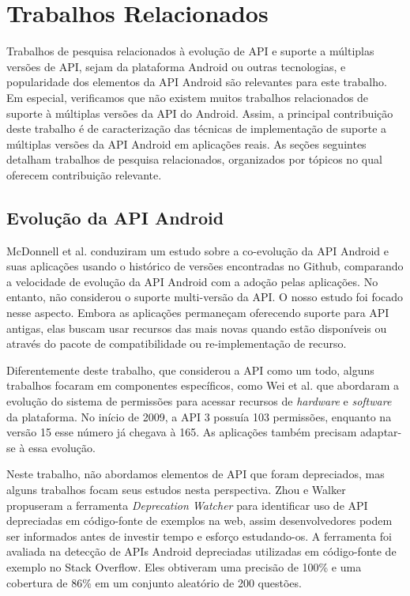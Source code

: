 \chapter{Trabalhos Relacionados} \label{ch:trabalhos-relacionados}

Trabalhos de pesquisa relacionados à evolução de API e suporte a múltiplas versões
de API, sejam da plataforma Android ou outras tecnologias, e popularidade dos
elementos da API Android são relevantes para este trabalho. Em especial, verificamos
que não existem muitos trabalhos relacionados de suporte à múltiplas versões da API
do Android. Assim, a principal contribuição deste trabalho é de caracterização das
técnicas de implementação de suporte a múltiplas versões da API Android em aplicações
reais. As seções seguintes detalham trabalhos de pesquisa relacionados, organizados
por tópicos no qual oferecem contribuição relevante.

\section{Evolução da API Android}

McDonnell et al. \cite{McDonnell2013} conduziram um estudo sobre a co-evolução da API
Android e suas aplicações usando o histórico de versões encontradas no Github, comparando
a velocidade de evolução da API Android com a adoção pelas aplicações. No entanto, não
considerou o suporte multi-versão da API. O nosso estudo foi focado nesse aspecto. Embora
as aplicações permaneçam oferecendo suporte para API antigas, elas buscam usar recursos das
mais novas quando estão disponíveis ou através do pacote de compatibilidade ou re-implementação
de recurso.

Diferentemente deste trabalho, que considerou a API como um todo, alguns trabalhos focaram
em componentes específicos, como Wei et al.\cite{Wei2012} que abordaram a evolução do sistema
de permissões para acessar recursos de \textit{hardware} e \textit{software} da plataforma.
No início de 2009, a API 3 possuía 103 permissões, enquanto na versão 15 esse número já chegava
à 165. As aplicações também precisam adaptar-se à essa evolução. 

Neste trabalho, não abordamos elementos de API que foram depreciados, mas alguns trabalhos
focam seus estudos nesta perspectiva.  Zhou e Walker \cite{Zhou2016} propuseram a ferramenta
\textit{Deprecation Watcher} para identificar uso de API depreciadas em código-fonte de exemplos
na web, assim desenvolvedores podem ser informados antes de investir tempo e esforço estudando-os.
A ferramenta foi avaliada na detecção de APIs Android depreciadas utilizadas em código-fonte de exemplo no Stack Overflow. Eles obtiveram uma precisão de 100\% e uma cobertura de 86\% em um
conjunto aleatório de 200 questões.


